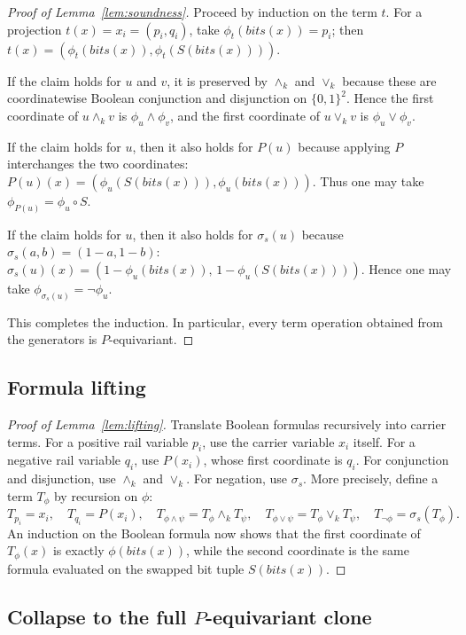 \documentclass[11pt]{article}
\theoremstyle{remark}
\newcommand{\meetk}{\ensuremath{\wedge_k}}
\newcommand{\joink}{\ensuremath{\vee_k}}
\newcommand{\bits}{\mathit{bits}}
\begin{document}
\begin{proof}[Proof of Lemma~\ref{lem:soundness}]
Proceed by induction on the term $t$. For a projection $t(x)=x_i=(p_i,q_i)$,
take $\phi_t(\bits(x))=p_i$; then
$t(x)=(\phi_t(\bits(x)),\phi_t(S(\bits(x))))$.

If the claim holds for $u$ and $v$, it is preserved by $\meetk$ and
$\joink$ because these are coordinatewise Boolean conjunction and
disjunction on $\{0,1\}^2$. Hence the first coordinate of $u\meetk v$ is
$\phi_u\wedge\phi_v$, and the first coordinate of $u\joink v$ is
$\phi_u\vee\phi_v$.

If the claim holds for $u$, then it also holds for $P(u)$ because applying
$P$ interchanges the two coordinates:
$P(u)(x)=(\phi_u(S(\bits(x))),\phi_u(\bits(x)))$. Thus one may take
$\phi_{P(u)}=\phi_u\circ S$.

If the claim holds for $u$, then it also holds for $\sigma_s(u)$ because
$\sigma_s(a,b)=(1-a,1-b)$:
$\sigma_s(u)(x)=(1-\phi_u(\bits(x)),\,1-\phi_u(S(\bits(x))))$. Hence one
may take $\phi_{\sigma_s(u)}=\neg\phi_u$.

This completes the induction. In particular, every term operation obtained
from the generators is $P$-equivariant.
\end{proof}

\subsection{Formula lifting}

\begin{proof}[Proof of Lemma~\ref{lem:lifting}]
Translate Boolean formulas recursively into carrier terms. For a positive
rail variable $p_i$, use the carrier variable $x_i$ itself. For a negative
rail variable $q_i$, use $P(x_i)$, whose first coordinate is $q_i$. For
conjunction and disjunction, use $\meetk$ and $\joink$. For negation, use
$\sigma_s$. More precisely, define a term $T_\phi$ by recursion on $\phi$:
\[
T_{p_i}=x_i,\quad T_{q_i}=P(x_i),\quad
T_{\phi\wedge\psi}=T_\phi\meetk T_\psi,\quad
T_{\phi\vee\psi}=T_\phi\joink T_\psi,\quad
T_{\neg\phi}=\sigma_s(T_\phi).
\]
An induction on the Boolean formula now shows that the first coordinate of
$T_\phi(x)$ is exactly $\phi(\bits(x))$, while the second coordinate is the
same formula evaluated on the swapped bit tuple $S(\bits(x))$.
\end{proof}

\subsection{Collapse to the full \texorpdfstring{$P$}{P}-equivariant clone}
\end{document}
